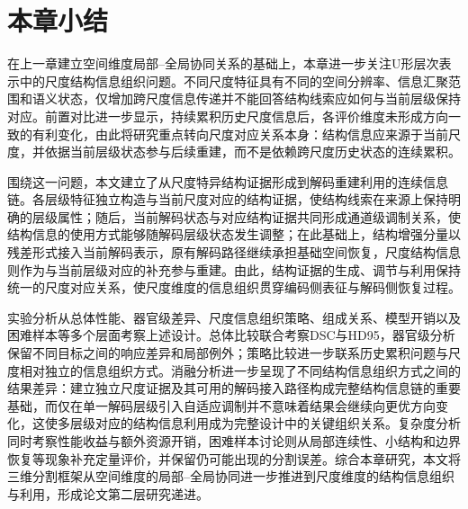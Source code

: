 \section{本章小结}

在上一章建立空间维度局部--全局协同关系的基础上，本章进一步关注U形层次表示中的尺度结构信息组织问题。不同尺度特征具有不同的空间分辨率、信息汇聚范围和语义状态，仅增加跨尺度信息传递并不能回答结构线索应如何与当前层级保持对应。前置对比进一步显示，持续累积历史尺度信息后，各评价维度未形成方向一致的有利变化，由此将研究重点转向尺度对应关系本身：结构信息应来源于当前尺度，并依据当前层级状态参与后续重建，而不是依赖跨尺度历史状态的连续累积。

围绕这一问题，本文建立了从尺度特异结构证据形成到解码重建利用的连续信息链。各层级特征独立构造与当前尺度对应的结构证据，使结构线索在来源上保持明确的层级属性；随后，当前解码状态与对应结构证据共同形成通道级调制关系，使结构信息的使用方式能够随解码层级状态发生调整；在此基础上，结构增强分量以残差形式接入当前解码表示，原有解码路径继续承担基础空间恢复，尺度结构信息则作为与当前层级对应的补充参与重建。由此，结构证据的生成、调节与利用保持统一的尺度对应关系，使尺度维度的信息组织贯穿编码侧表征与解码侧恢复过程。

实验分析从总体性能、器官级差异、尺度信息组织策略、组成关系、模型开销以及困难样本等多个层面考察上述设计。总体比较联合考察DSC与HD95，器官级分析保留不同目标之间的响应差异和局部例外；策略比较进一步联系历史累积问题与尺度相对独立的信息组织方式。消融分析进一步呈现了不同结构信息组织方式之间的结果差异：建立独立尺度证据及其可用的解码接入路径构成完整结构信息链的重要基础，而仅在单一解码层级引入自适应调制并不意味着结果会继续向更优方向变化，这使多层级对应的结构信息利用成为完整设计中的关键组织关系。复杂度分析同时考察性能收益与额外资源开销，困难样本讨论则从局部连续性、小结构和边界恢复等现象补充定量评价，并保留仍可能出现的分割误差。综合本章研究，本文将三维分割框架从空间维度的局部--全局协同进一步推进到尺度维度的结构信息组织与利用，形成论文第二层研究递进。
